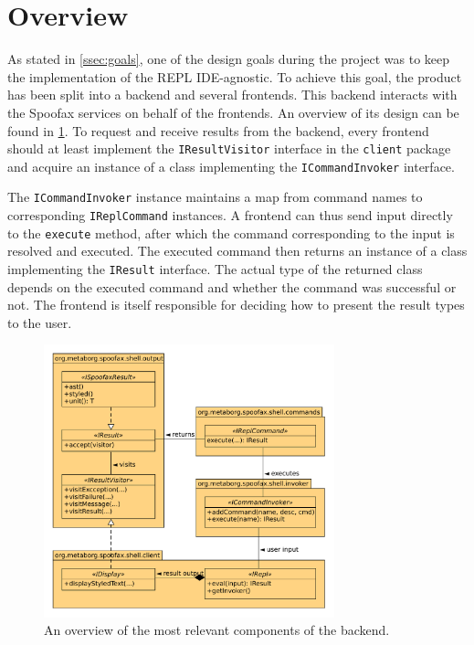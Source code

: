 \section{Overview}
\label{sec:overview}

As stated in \cref{ssec:goals}, one of the design goals during the project was
to keep the implementation of the REPL IDE-agnostic. To achieve this goal, the
product has been split into a backend and several frontends. This backend
interacts with the Spoofax services on behalf of the frontends. An overview of
its design can be found in \cref{fig:uml-overview}. To request and receive
results from the backend, every frontend should at least implement the
\texttt{IResultVisitor} interface in the \texttt{client} package and
acquire an instance of a class implementing the \texttt{ICommandInvoker}
interface.

The \texttt{ICommandInvoker} instance maintains a map from command names to
corresponding \texttt{IReplCommand} instances. A frontend can thus send
input directly to the \texttt{execute} method, after which the command
corresponding to the input is resolved and executed. The executed command
then returns an instance of a class implementing the \texttt{IResult}
interface. The actual type of the returned class depends on the executed command
and whether the command was successful or not. The frontend is itself
responsible for deciding how to present the result types to the user.

\begin{figure}[h!]
  \centering
  \includegraphics[width=0.75\textwidth]{uml-overview}
  \caption{An overview of the most relevant components of the backend.}
  \label{fig:uml-overview}
\end{figure}
